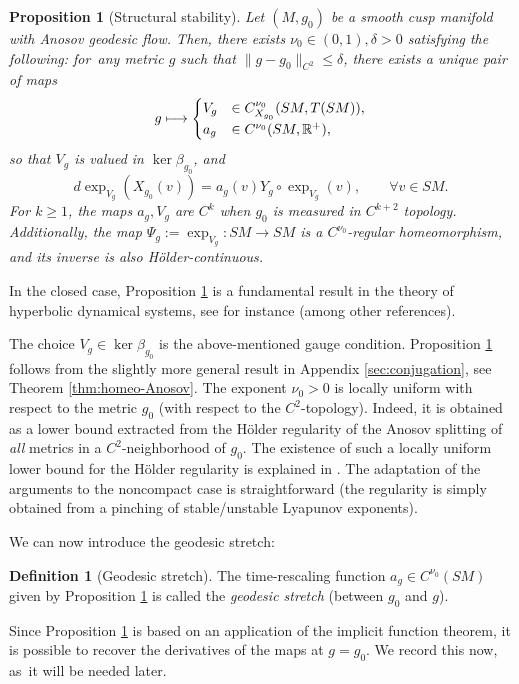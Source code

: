 \documentclass[JEP,XML,SOM,Unicode,NoFloatCountersInSection]{cedram}
\newcommand\mto{\mathchoice{\longmapsto}{\mapsto}{\mapsto}{\mapsto}}
\newcommand{\R}{\mathbb{R}}
\theoremstyle{plain}
\newtheorem{proposition}{Proposition}[section]
\theoremstyle{definition}
\newtheorem{definition}{Definition}[section]
\begin{document}
\begin{proposition}[Structural stability]
\label{prop:conjugation}
Let $(M,g_0)$ be a smooth cusp manifold with Anosov geodesic flow. Then, there exists $\nu_0 \in (0,1), \delta>0$ satisfying the following: for~any metric $g$ such that $\|g-g_0\|_{C^2}\leq \delta$, there exists a unique pair of maps
\[
g \mto \begin{cases} V_g &\in C_{X_{g_0}}^{\nu_0}(SM, T( SM)), \\ a_{g} &\in C^{\nu_0}(SM, \R^+),\end{cases}
\]
so that $V_g$ is valued in $\ker \beta_{g_0}$, and
\[
d \exp_{V_g}(X_{g_0}(v)) = a_g (v)Y_g \circ \exp_{V_g}(v), \qquad \forall v \in SM.
\]
For $k \geq 1$, the maps $a_g,V_g$ are $C^k$ when $g_0$ is measured in $C^{k+2}$ topology. Additionally, the map $\Psi_{g} := \exp_{V_g} : SM \to SM$ is a $C^{\nu_0}$-regular homeomorphism, and its inverse is also H\"older-continuous.
\end{proposition}

{\color{black}In the closed case, Proposition \ref{prop:conjugation} is a fundamental result in the theory of hyperbolic dynamical systems, see \cite{Katok-Knieper-Pollicott-Weiss-89,Contreras-92} for instance (among other references).}

The choice $V_g \in \ker \beta_{g_0}$ is the above-mentioned gauge condition. Proposition \ref{prop:conjugation} follows from the slightly more general result in Appendix \ref{sec:conjugation}, see Theorem \ref{thm:homeo-Anosov}. The exponent $\nu_0 > 0$ is locally uniform with respect to the metric $g_0$ (with respect to the $C^2$-topology). Indeed, it is obtained as a lower bound extracted from the Hölder regularity of the Anosov splitting of \emph{all} metrics in a $C^2$-neighborhood of $g_0$. The existence of such a locally uniform lower bound for the Hölder regularity is explained in \cite[Lem.\,5.4]{Bonthonneau-Lefeuvre-21}. The adaptation of the arguments to the noncompact case is straightforward (the regularity is simply obtained from a pinching of stable/unstable Lyapunov exponents).

We can now introduce the geodesic stretch:

\begin{definition}[Geodesic stretch]
The time-rescaling function $a_{g} \in C^{\nu_0}(SM)$ given by Proposition \ref{prop:conjugation} is called the \emph{geodesic stretch} (between $g_0$ and $g$).
\end{definition}

Since Proposition \ref{prop:conjugation} is based on an application of the implicit function theorem, it is possible to recover the derivatives of the maps at $g=g_0$. We record this now, as~it will be needed later.
\end{document}
